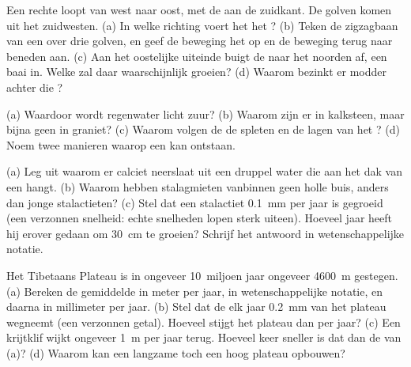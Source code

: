 \begin{exercise}[$\star\star$]\label{exo:g9:landforms:7}
Een rechte  loopt van west naar oost, met de  aan de zuidkant. De
golven komen uit het zuidwesten. (a) In welke richting voert het
 het ? (b) Teken de zigzagbaan van een  over
drie golven, en geef de beweging het  op en de beweging terug naar
beneden aan. (c) Aan het oostelijke uiteinde buigt de  naar het noorden
af, een baai in. Welke  zal daar waarschijnlijk groeien?
(d) Waarom bezinkt er modder achter die ?
\end{exercise}

\begin{exercise}[$\star\star$]\label{exo:g9:landforms:8}
(a) Waardoor wordt regenwater licht zuur? (b) Waarom zijn er  in
kalksteen, maar bijna geen in graniet? (c) Waarom volgen de  de
spleten en de lagen van het ? (d) Noem twee manieren waarop een
 kan ontstaan.
\end{exercise}

\begin{exercise}[$\star\star$]\label{exo:g9:landforms:9}
(a) Leg uit waarom er calciet neerslaat uit een druppel water die aan het
dak van een  hangt. (b) Waarom hebben stalagmieten vanbinnen geen holle
buis, anders dan jonge stalactieten? (c) Stel dat een stalactiet
\qty{0.1}{mm} per jaar is gegroeid (een verzonnen snelheid: echte
snelheden lopen sterk uiteen). Hoeveel jaar heeft hij erover gedaan om
\qty{30}{cm} te groeien? Schrijf het antwoord in wetenschappelijke notatie.
\end{exercise}

\begin{exercise}[$\star\star$]\label{exo:g9:landforms:10}
Het Tibetaans Plateau is in ongeveer 10~miljoen jaar ongeveer
\qty{4600}{m} gestegen. (a) Bereken de gemiddelde  in meter per
jaar, in wetenschappelijke notatie, en daarna in millimeter per jaar.
(b) Stel dat de  elk jaar \qty{0.2}{mm} van het plateau wegneemt (een
verzonnen getal). Hoeveel stijgt het plateau dan per jaar? (c) Een
krijtklif wijkt ongeveer \qty{1}{m} per jaar terug. Hoeveel keer sneller is
dat dan de  van (a)? (d) Waarom kan een langzame  toch
een hoog plateau opbouwen?
\end{exercise}

